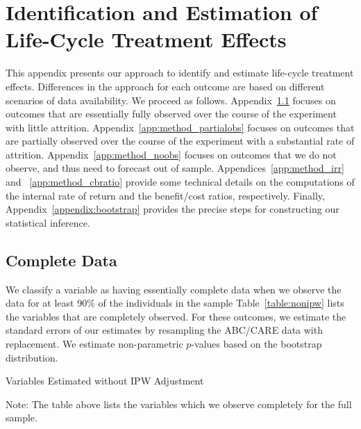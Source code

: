 \section{Identification and Estimation of Life-Cycle Treatment Effects} \label{appendix:methodology}

This appendix presents our approach to identify and estimate life-cycle treatment effects. Differences in the approach for each outcome are based on different scenarios of data availability. We proceed as follows. Appendix~\ref{app:method_fullobs} focuses on outcomes that are essentially fully observed over the course of the experiment with little attrition. Appendix~\ref{app:method_partialobs} focuses on outcomes that are partially observed over the course of the experiment with a substantial rate of attrition. Appendix~\ref{app:method_noobs}  focuses on outcomes that we do not observe, and thus need to forecast out of sample. Appendices~\ref{app:method_irr} and ~\ref{app:method_cbratio} provide some technical details on the computations of the internal rate of return and the benefit/cost ratios, respectively. Finally, Appendix~\ref{appendix:bootstrap} provides the precise steps for constructing our statistical inference.

\subsection{Complete Data}\label{app:method_fullobs}

We classify a variable as having essentially complete data when we observe the data for at least 90\% of the individuals in the sample Table~\ref{table:nonipw} lists the variables that are completely observed. For these outcomes, we estimate the standard errors of our estimates by resampling the ABC/CARE data with replacement. We estimate non-parametric $p$-values based on the bootstrap distribution.

\begin{table}[H]
\begin{threeparttable}
\caption{Variables Estimated without IPW Adjustment}
\label{table:nonipw}
\centering

\begin{tablenotes}
\footnotesize
\item Note: The table above lists the variables which we observe completely for the full sample.
\end{tablenotes}
\end{threeparttable}
\end{table}

